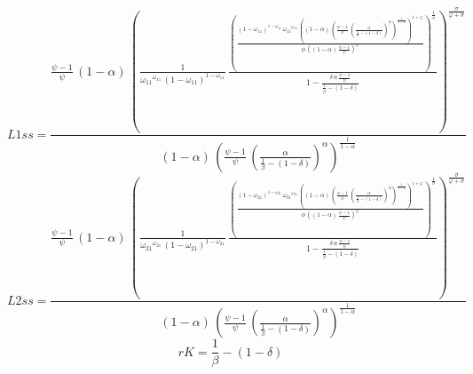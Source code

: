 \begin{dmath*}
L1ss = \frac{\frac{{{\psi}}-1}{{{\psi}}}\, \left(1-{{\alpha}}\right)\, \left(\frac{1}{{{\omega_{11}}}^{{{\omega_{11}}}}\, \left(1-{{\omega_{11}}}\right)^{1-{{\omega_{11}}}}}\, \frac{\left(\frac{\left(1-{{\omega_{11}}}\right)^{1-{{\omega_{11}}}}\, {{\omega_{11}}}^{{{\omega_{11}}}}\, \left(\left(1-{{\alpha}}\right)\, \left(\frac{{{\psi}}-1}{{{\psi}}}\, \left(\frac{{{\alpha}}}{\frac{1}{{{\beta}}}-\left(1-{{\delta}}\right)}\right)^{{{\alpha}}}\right)^{\frac{1}{1-{{\alpha}}}}\right)^{1+{{\varphi}}}}{{{\phi}}\, \left(\left(1-{{\alpha}}\right)\, \frac{{{\psi}}-1}{{{\psi}}}\right)^{{{\varphi}}}}\right)^{\frac{1}{{{\sigma}}}}}{1-\frac{{{\delta}}\, {{\alpha}}\, \frac{{{\psi}}-1}{{{\psi}}}}{\frac{1}{{{\beta}}}-\left(1-{{\delta}}\right)}}\right)^{\frac{{{\sigma}}}{{{\varphi}}+{{\sigma}}}}}{\left(1-{{\alpha}}\right)\, \left(\frac{{{\psi}}-1}{{{\psi}}}\, \left(\frac{{{\alpha}}}{\frac{1}{{{\beta}}}-\left(1-{{\delta}}\right)}\right)^{{{\alpha}}}\right)^{\frac{1}{1-{{\alpha}}}}}
\end{dmath*}
\begin{dmath*}
L2ss = \frac{\frac{{{\psi}}-1}{{{\psi}}}\, \left(1-{{\alpha}}\right)\, \left(\frac{1}{{{\omega_{21}}}^{{{\omega_{21}}}}\, \left(1-{{\omega_{21}}}\right)^{1-{{\omega_{21}}}}}\, \frac{\left(\frac{\left(1-{{\omega_{21}}}\right)^{1-{{\omega_{21}}}}\, {{\omega_{21}}}^{{{\omega_{21}}}}\, \left(\left(1-{{\alpha}}\right)\, \left(\frac{{{\psi}}-1}{{{\psi}}}\, \left(\frac{{{\alpha}}}{\frac{1}{{{\beta}}}-\left(1-{{\delta}}\right)}\right)^{{{\alpha}}}\right)^{\frac{1}{1-{{\alpha}}}}\right)^{1+{{\varphi}}}}{{{\phi}}\, \left(\left(1-{{\alpha}}\right)\, \frac{{{\psi}}-1}{{{\psi}}}\right)^{{{\varphi}}}}\right)^{\frac{1}{{{\sigma}}}}}{1-\frac{{{\delta}}\, {{\alpha}}\, \frac{{{\psi}}-1}{{{\psi}}}}{\frac{1}{{{\beta}}}-\left(1-{{\delta}}\right)}}\right)^{\frac{{{\sigma}}}{{{\varphi}}+{{\sigma}}}}}{\left(1-{{\alpha}}\right)\, \left(\frac{{{\psi}}-1}{{{\psi}}}\, \left(\frac{{{\alpha}}}{\frac{1}{{{\beta}}}-\left(1-{{\delta}}\right)}\right)^{{{\alpha}}}\right)^{\frac{1}{1-{{\alpha}}}}}
\end{dmath*}
\begin{dmath*}
rK = \frac{1}{{{\beta}}}-\left(1-{{\delta}}\right)
\end{dmath*}
